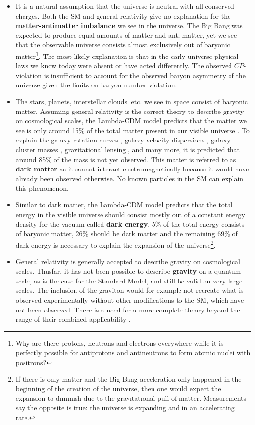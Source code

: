 \begin{itemize}
\item It is a natural assumption that the universe is neutral with all conserved charges. Both the SM and general relativity give no explanation for the \textbf{matter-antimatter imbalance} we see in the universe. The Big Bang was expected to produce equal amounts of matter and anti-matter, yet we see that the observable universe consists almost exclusively out of baryonic matter\footnote{Why are there protons, neutrons and electrons everywhere while it is perfectly possible for antiprotons and antineutrons to form atomic nuclei with positrons?}. The most likely explanation is that in the early universe physical laws we know today were absent or have acted differently. The observed $CP$-violation is insufficient to account for the observed baryon asymmetry of the universe given the limits on baryon number violation.
\item The stars, planets, interstellar clouds, etc. we see in space consist of baryonic matter. Assuming general relativity is the correct theory to describe gravity on cosmological scales, the Lambda-CDM model predicts that the matter we see is only around 15\% of the total matter present in our visible universe \cite{Ade:2015xua}. To explain the galaxy rotation curves \cite{Corbelli:1999af}, galaxy velocity dispersions \cite{Faber:1976sn}, galaxy cluster masses \cite{Allen:2011zs}, gravitational lensing \cite{Natarajan:2017sbo}, and many more, it is predicted that around 85\% of the mass is not yet observed. This matter is referred to as \textbf{dark matter} as it cannot interact electromagnetically because it would have already been observed otherwise. No known particles in the SM can explain this phenomenon.
\item Similar to dark matter, the Lambda-CDM model predicts that the total energy in the visible universe should consist mostly out of a constant energy density for the vacuum called \textbf{dark energy}. 5\% of the total energy consists of baryonic matter, 26\% should be dark matter and the remaining 69\% of dark energy is necessary to explain the expansion of the universe\footnote{If there is only matter and the Big Bang acceleration only happened in the beginning of the creation of the universe, then one would expect the expansion to diminish due to the gravitational pull of matter. Measurements say the opposite is true: the universe is expanding and in an accelerating rate.}.
\item General relativity is generally accepted to describe gravity on cosmological scales. Thusfar, it has not been possible to describe \textbf{gravity} on a quantum scale, as is the case for the Standard Model, and still be valid on very large scales. The inclusion of the graviton would for example not recreate what is observed experimentally without other modifications to the SM, which have not been observed. There is a need for a more complete theory beyond the range of their combined applicability \cite{Donoghue:2012zc}.

\end{itemize}
